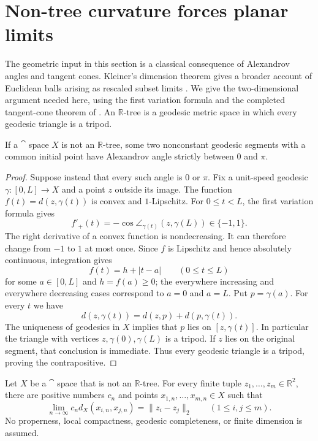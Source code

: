 \section{Non-tree curvature forces planar limits}
\label{sec:nontree-planar}

The geometric input in this section is a classical consequence of
Alexandrov angles and tangent cones.  Kleiner's dimension theorem gives
a broader account of Euclidean balls arising as rescaled subset limits
\cite[Theorem A(3), p.~2 of the author preprint]{Kleiner1999}.
We give the two-dimensional argument needed here, using the first
variation formula and the completed tangent-cone theorem of
\cite[II.3.6, II.3.18--3.19, pp.~185, 190--192]{BH1999}.
An $\mathbb R$-tree is a geodesic metric space in which every geodesic
triangle is a tripod.

\begin{lemma}\label{lem:nontree-angle}
If a $\cat$ space $X$ is not an $\mathbb R$-tree, some two nonconstant
geodesic segments with a common initial point have Alexandrov angle
strictly between $0$ and $\pi$.
\end{lemma}

\begin{proof}
Suppose instead that every such angle is $0$ or $\pi$.
Fix a unit-speed geodesic $\gamma:[0,L]\longrightarrow X$ and a point
$z$ outside its image.  The function
$f(t)=d(z,\gamma(t))$ is convex and $1$-Lipschitz.
For $0\le t<L$, the first variation formula gives
\[
 f'_+(t)=-\cos\angle_{\gamma(t)}(z,\gamma(L))\in\{-1,1\}.
\]
The right derivative of a convex function is nondecreasing.
It can therefore change from $-1$ to $1$ at most once.  Since $f$ is
Lipschitz and hence absolutely continuous, integration gives
\[
 f(t)=h+|t-a|\qquad(0\le t\le L)
\]
for some $a\in[0,L]$ and $h=f(a)\ge0$; the everywhere increasing and
everywhere decreasing cases correspond to $a=0$ and $a=L$.
Put $p=\gamma(a)$.  For every $t$ we have
\[
 d(z,\gamma(t))=d(z,p)+d(p,\gamma(t)).
\]
The uniqueness of geodesics in $X$ implies that $p$ lies on
$[z,\gamma(t)]$.  In particular the triangle with vertices
$z,\gamma(0),\gamma(L)$ is a tripod.  If $z$ lies on the original
segment, that conclusion is immediate.  Thus every geodesic triangle
is a tripod, proving the contrapositive.
\end{proof}

\begin{theorem}\label{thm:nontree-planar-limit}
Let $X$ be a $\cat$ space that is not an $\mathbb R$-tree.
For every finite tuple $z_1,\ldots,z_m\in\mathbb R^2$, there are
positive numbers $c_n$ and points $x_{1,n},\ldots,x_{m,n}\in X$ such
that
\begin{equation}\label{eq:nontree-planar-limit}
 \lim_{n\to\infty}c_n d_X(x_{i,n},x_{j,n})
   =\|z_i-z_j\|_2\qquad(1\le i,j\le m).
\end{equation}
No properness, local compactness, geodesic completeness, or finite
dimension is assumed.
\end{theorem}

